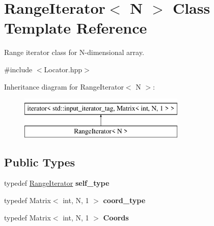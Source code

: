 \hypertarget{class_d_o_1_1_range_iterator}{\section{Range\-Iterator$<$ N $>$ Class Template Reference}
\label{class_d_o_1_1_range_iterator}
}


Range iterator class for N-\/dimensional array.  




{\ttfamily \#include $<$Locator.\-hpp$>$}

Inheritance diagram for Range\-Iterator$<$ N $>$\-:\begin{figure}[H]
\begin{center}
\leavevmode
\includegraphics[height=2.000000cm]{class_d_o_1_1_range_iterator}
\end{center}
\end{figure}
\subsection*{Public Types}
\begin{DoxyCompactItemize}
\item 
\hypertarget{class_d_o_1_1_range_iterator_ac7678145ef96277c34f6516df859937c}{typedef \hyperlink{class_d_o_1_1_range_iterator}{Range\-Iterator} {\bfseries self\-\_\-type}}\label{class_d_o_1_1_range_iterator_ac7678145ef96277c34f6516df859937c}

\item 
\hypertarget{class_d_o_1_1_range_iterator_ae4fb477425bbeb20329d300396ac2582}{typedef Matrix$<$ int, N, 1 $>$ {\bfseries coord\-\_\-type}}\label{class_d_o_1_1_range_iterator_ae4fb477425bbeb20329d300396ac2582}

\item 
\hypertarget{class_d_o_1_1_range_iterator_a354195d823689d8ace92cf1499462880}{typedef Matrix$<$ int, N, 1 $>$ {\bfseries Coords}}\label{class_d_o_1_1_range_iterator_a354195d823689d8ace92cf1499462880}

\end{DoxyCompactItemize}

